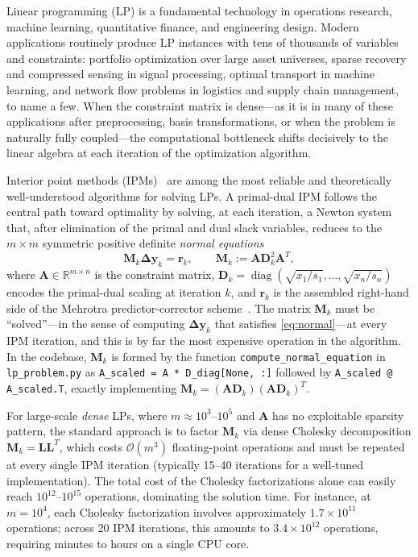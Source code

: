 \documentclass[11pt,twoside]{article}
\newcommand{\R}{\mathbb{R}}
\newcommand{\bA}{\mathbf{A}}
\newcommand{\by}{\mathbf{y}}
\newcommand{\bD}{\mathbf{D}}
\newcommand{\bL}{\mathbf{L}}
\newcommand{\bM}{\mathbf{M}}
\newcommand{\br}{\mathbf{r}}
\newcommand{\bDelta}{\mathbf{\Delta}}
\newcommand{\cO}{\mathcal{O}}
\newcommand{\diag}{\operatorname{diag}}
\begin{document}
Linear programming (LP) is a fundamental technology in operations research,
machine learning, quantitative finance, and engineering design.  Modern
applications routinely produce LP instances with tens of thousands of
variables and constraints: portfolio optimization over large asset
universes, sparse recovery and compressed sensing in signal processing,
optimal transport in machine learning, and network flow problems in
logistics and supply chain management, to name a few.  When the constraint
matrix is dense---as it is in many of these applications after
preprocessing, basis transformations, or when the problem is naturally
fully coupled---the computational bottleneck shifts decisively to the
linear algebra at each iteration of the optimization algorithm.

Interior point methods (IPMs)~\cite{Wright1997,Nesterov1994} are among the
most reliable and theoretically well-understood algorithms for solving LPs.
A primal-dual IPM follows the central path toward optimality by solving, at
each iteration, a Newton system that, after elimination of the primal and
dual slack variables, reduces to the $m \times m$ symmetric positive
definite \emph{normal equations}
\begin{equation}
  \bM_k \bDelta\by_k = \br_k, \qquad
  \bM_k := \bA \bD_k^2 \bA^T,
  \label{eq:normal}
\end{equation}
where $\bA \in \R^{m \times n}$ is the constraint matrix,
$\bD_k = \diag(\sqrt{x_1/s_1},\dots,\sqrt{x_n/s_n})$ encodes the
primal-dual scaling at iteration $k$, and $\br_k$ is the assembled
right-hand side of the Mehrotra predictor-corrector
scheme~\cite{Mehrotra1992}.  The matrix $\bM_k$ must be ``solved''---in
the sense of computing $\bDelta\by_k$ that satisfies
\eqref{eq:normal}---at every IPM iteration, and this is by far the most
expensive operation in the algorithm.  In the codebase, $\bM_k$ is formed
by the function \texttt{compute\_normal\_equation} in
\texttt{lp\_problem.py} as \texttt{A\_scaled = A * D\_diag[None, :]}
followed by \texttt{A\_scaled @ A\_scaled.T}, exactly implementing
$\bM_k = (\bA\bD_k)(\bA\bD_k)^T$.

For large-scale \emph{dense} LPs, where $m \approx 10^3$--$10^5$ and
$\bA$ has no exploitable sparsity pattern, the standard approach is to
factor $\bM_k$ via dense Cholesky decomposition $\bM_k = \bL\bL^T$,
which costs $\cO(m^3)$ floating-point operations and must be repeated at
every single IPM iteration (typically 15--40 iterations for a well-tuned
implementation).  The total cost of the Cholesky factorizations alone can
easily reach $10^{12}$--$10^{15}$ operations, dominating the solution
time.  For instance, at $m = 10^4$, each Cholesky factorization involves
approximately $1.7 \times 10^{11}$ operations; across 20 IPM iterations,
this amounts to $3.4 \times 10^{12}$ operations, requiring minutes to
hours on a single CPU core.
\end{document}
